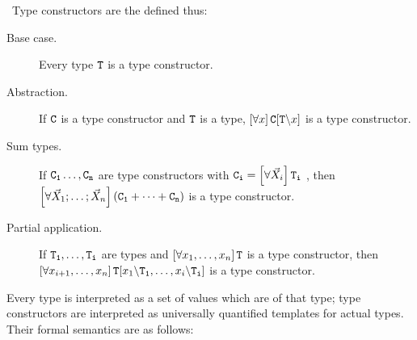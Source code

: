 \begin{definition}\label{def:typeCon}\
	Type constructors are the defined thus:
	\begin{description}
		\item[Base case.] Every type $\mathtt{T}$ is a type constructor.
		\item[Abstraction.] If $\mathtt{C}$ is a type constructor and $\mathtt{T}$ is a type, $\left[\forall x \right] \mathtt{C}[\mathtt{T}\backslash x]$ is a type constructor.
		\item[Sum types.] If $\mathtt{C_1}\dots,\mathtt{C_n}$ are type constructors with $\mathtt{C_i} = \left[\forall \vec{X}_i \right] \mathtt{T_i}$ , then $\left[\forall \vec{X}_1; \dots; \vec{X}_n \right] (\mathtt{C_1} + \dots + \mathtt{C_n})$ is a type constructor.
		\item[Partial application.] If $\mathtt{T_1},\dots,\mathtt{T_i}$ \paren{$i < n$} are types and $\left[\forall x_1,\dots,x_n \right] \mathtt{T}$ is a type constructor, then $\left[\forall x_{i+1},\dots,x_n \right] \mathtt{T}[x_1\backslash \mathtt{T_1},\dots,x_i\backslash \mathtt{T_i}]$ is a type constructor.
	\end{description}
\end{definition}

Every type is interpreted as a set of values which are of that type; type constructors are interpreted as universally quantified templates for actual types. Their formal semantics are as follows:

